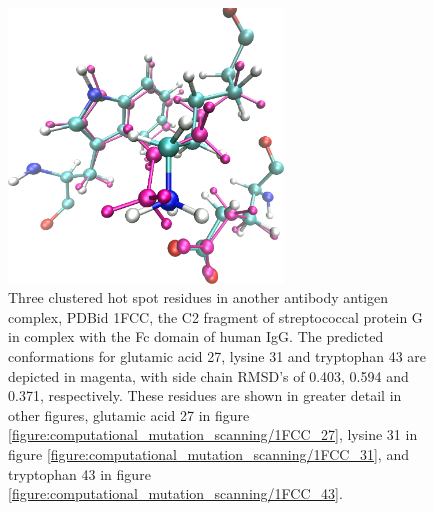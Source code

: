 


\begin{figure}[h]
  \centering
  \includegraphics[width=0.65\textwidth,height=0.3\textheight,keepaspectratio]{figures/mutation_side_chain_images/1fcc_27_31_43.png}
  \caption{Three clustered hot spot residues in another antibody antigen complex, PDBid 1FCC, the C2 fragment of streptococcal protein G in complex with the Fc domain of human IgG.
The predicted conformations for glutamic acid 27, lysine 31 and tryptophan 43 are depicted in magenta, with side chain RMSD's of 0.403, 0.594 and 0.371, respectively.
These residues are shown in greater detail in other figures, glutamic acid 27 in figure \protect\ref{figure:computational_mutation_scanning/1FCC_27}, lysine 31 in figure \protect\ref{figure:computational_mutation_scanning/1FCC_31}, and tryptophan 43 in figure \protect\ref{figure:computational_mutation_scanning/1FCC_43}.}
  \label{figure:computational_mutation_scanning/1FCC_27_31_43}
\end{figure}


